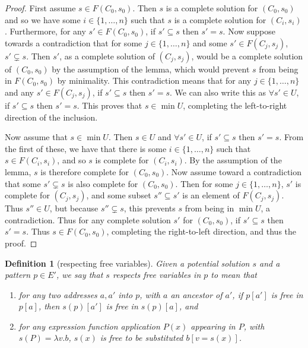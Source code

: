 \documentclass{article}
\newtheorem{dfn}{Definition}
\begin{document}
\begin{proof}
First assume $s\in F(C_0,s_0)$.  Then $s$ is a complete solution for $(C_0,s_0)$ and so we have some $i\in\{1,\ldots,n\}$ such that $s$ is a complete solution for $(C_i,s_i)$.  Furthermore, for any $s'\in F(C_0,s_0)$, if $s'\subseteq s$ then $s'=s$.  Now suppose towards a contradiction that for some $j\in\{1,\ldots,n\}$ and some $s'\in F(C_j,s_j)$, $s'\subsetneq s$.  Then $s'$, as a complete solution of $(C_j,s_j)$, would be a complete solution of $(C_0,s_0)$ by the assumption of the lemma, which would prevent $s$ from being in $F(C_0,s_0)$ by minimality.  This contradiction means that for any $j\in\{1,\ldots,n\}$ and any $s'\in F(C_j,s_j)$, if $s'\subseteq s$ then $s'=s$.  We can also write this as $\forall s'\in U$, if $s'\subseteq s$ then $s'=s$.  This proves that $s\in\min U$, completing the left-to-right direction of the inclusion.

Now assume that $s\in\min U$.  Then $s\in U$ and $\forall s'\in U$, if $s'\subseteq s$ then $s'=s$.  From the first of these, we have that there is some $i\in\{1,\ldots,n\}$ such that $s\in F(C_i,s_i)$, and so $s$ is complete for $(C_i,s_i)$.  By the assumption of the lemma, $s$ is therefore complete for $(C_0,s_0)$.  Now assume toward a contradiction that some $s'\subsetneq s$ is also complete for $(C_0,s_0)$.  Then for some $j\in\{1,\ldots,n\}$, $s'$ is complete for $(C_j,s_j)$, and some subset $s''\subseteq s'$ is an element of $F(C_j,s_j)$.  Thus $s''\in U$, but because $s''\subsetneq s$, this prevents $s$ from being in $\min U$, a contradiction.  Thus for any complete solution $s'$ for $(C_0,s_0)$, if $s'\subseteq s$ then $s'=s$.  Thus $s\in F(C_0,s_0)$, completing the right-to-left direction, and thus the proof.
\end{proof}

\begin{dfn}[respecting free variables]\label{D:respect}
Given a potential solution $s$ and a pattern $p\in E'$, we say that \emph{$s$ respects free variables in $p$} to mean that
\begin{enumerate}
\item	for any two addresses $a,a'$ into $p$, with $a$ an ancestor of $a'$, if $p[a']$ is free in $p[a]$, then $s(p)[a']$ is free in $s(p)[a]$, and
\item	for any expression function application $P(x)$ appearing in $P$, with $s(P)=\lambda v.b$, $s(x)$ is free to be substituted $b[v=s(x)]$.
\end{enumerate}
\end{dfn}
\end{document}
